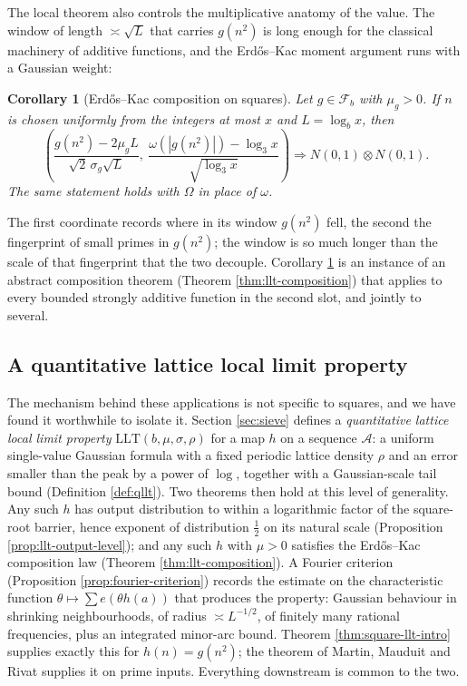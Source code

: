 \documentclass[11pt,reqno]{amsart}
\theoremstyle{plain}
\newtheorem{corollary}[theorem]{Corollary}
\theoremstyle{definition}
\newcommand{\ee}[1]{e\!\left(#1\right)}
\newcommand{\1}{\mathbf 1}
\begin{document}
The local theorem also controls the multiplicative anatomy of the value. The window of length $\asymp\sqrt L$ that carries $g(n^2)$ is long enough for the classical machinery of additive functions, and the Erd\H{o}s--Kac moment argument runs with a Gaussian weight:

\begin{corollary}[Erd\H{o}s--Kac composition on squares]\label{cor:square-ek-intro}
Let $g\in\mathcal F_b$ with $\mu_g>0$. If $n$ is chosen uniformly from the integers at most $x$ and $L=\log_bx$, then
\[
 \left(
 \frac{g(n^2)-2\mu_gL}{\sqrt2\,\sigma_g\sqrt L},\
 \frac{\omega(|g(n^2)|)-\log_3x}{\sqrt{\log_3x}}
 \right)
 \Longrightarrow N(0,1)\otimes N(0,1).
\]
The same statement holds with $\Omega$ in place of $\omega$.
\end{corollary}

The first coordinate records where in its window $g(n^2)$ fell, the second the fingerprint of small primes in $g(n^2)$; the window is so much longer than the scale of that fingerprint that the two decouple. Corollary \ref{cor:square-ek-intro} is an instance of an abstract composition theorem (Theorem \ref{thm:llt-composition}) that applies to every bounded strongly additive function in the second slot, and jointly to several.

\subsection{A quantitative lattice local limit property}
The mechanism behind these applications is not specific to squares, and we have found it worthwhile to isolate it. Section \ref{sec:sieve} defines a \emph{quantitative lattice local limit property} $\mathrm{LLT}(b,\mu,\sigma,\rho)$ for a map $h$ on a sequence $\mathcal A$: a uniform single-value Gaussian formula with a fixed periodic lattice density $\rho$ and an error smaller than the peak by a power of $\log$, together with a Gaussian-scale tail bound (Definition \ref{def:qllt}). Two theorems then hold at this level of generality. Any such $h$ has output distribution to within a logarithmic factor of the square-root barrier, hence exponent of distribution $\tfrac12$ on its natural scale (Proposition \ref{prop:llt-output-level}); and any such $h$ with $\mu>0$ satisfies the Erd\H{o}s--Kac composition law (Theorem \ref{thm:llt-composition}). A Fourier criterion (Proposition \ref{prop:fourier-criterion}) records the estimate on the characteristic function $\theta\mapsto\sum\ee{\theta h(a)}$ that produces the property: Gaussian behaviour in shrinking neighbourhoods, of radius $\asymp L^{-1/2}$, of finitely many rational frequencies, plus an integrated minor-arc bound. Theorem \ref{thm:square-llt-intro} supplies exactly this for $h(n)=g(n^2)$; the theorem of Martin, Mauduit and Rivat supplies it on prime inputs. Everything downstream is common to the two.
\end{document}
